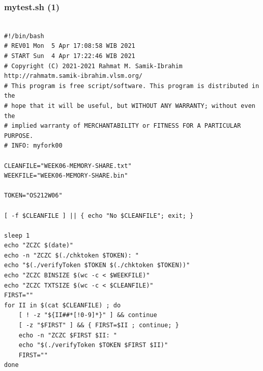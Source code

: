 \documentclass[aspectratio=169, xcolor=table, notheorems, hyperref={pdfpagelabels=false}]{beamer}
\begin{document}
\begin{frame}[fragile]
\frametitle{mytest.sh (1)}
\begin{lstlisting}[basicstyle=\ttfamily\tiny]         % 108

#!/bin/bash
# REV01 Mon  5 Apr 17:08:58 WIB 2021
# START Sun  4 Apr 17:22:46 WIB 2021
# Copyright (C) 2021-2021 Rahmat M. Samik-Ibrahim http://rahmatm.samik-ibrahim.vlsm.org/
# This program is free script/software. This program is distributed in the 
# hope that it will be useful, but WITHOUT ANY WARRANTY; without even the 
# implied warranty of MERCHANTABILITY or FITNESS FOR A PARTICULAR PURPOSE.
# INFO: myfork00

CLEANFILE="WEEK06-MEMORY-SHARE.txt"
WEEKFILE="WEEK06-MEMORY-SHARE.bin"

TOKEN="OS212W06"

[ -f $CLEANFILE ] || { echo "No $CLEANFILE"; exit; }

sleep 1
echo "ZCZC $(date)"
echo -n "ZCZC $(./chktoken $TOKEN): "
echo "$(./verifyToken $TOKEN $(./chktoken $TOKEN))"
echo "ZCZC BINSIZE $(wc -c < $WEEKFILE)"
echo "ZCZC TXTSIZE $(wc -c < $CLEANFILE)"
FIRST=""
for II in $(cat $CLEANFILE) ; do
    [ ! -z "${II##*[!0-9]*}" ] && continue
    [ -z "$FIRST" ] && { FIRST=$II ; continue; }
    echo -n "ZCZC $FIRST $II: "
    echo "$(./verifyToken $TOKEN $FIRST $II)"
    FIRST=""
done

\end{lstlisting}
\end{frame}
\end{document}

